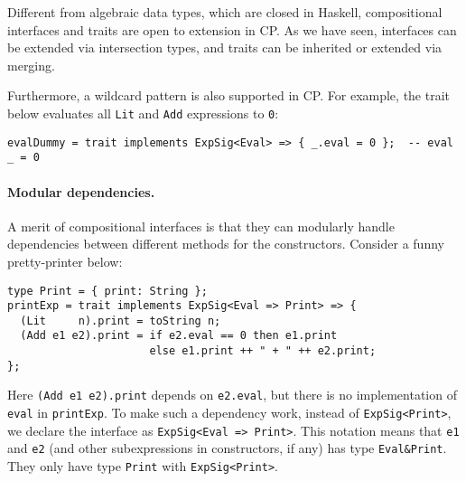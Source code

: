 \begin{tipblock}
Different from algebraic data types, which are closed in Haskell, compositional
interfaces and traits are open to extension in CP. As we have seen, interfaces
can be extended via intersection types, and traits can be inherited or extended
via merging.
\end{tipblock}

\noindent
Furthermore, a wildcard pattern is also supported in CP. For example, the trait
below evaluates all \lstinline{Lit} and \lstinline{Add} expressions to \lstinline{0}:
\begin{lstlisting}
evalDummy = trait implements ExpSig<Eval> => { _.eval = 0 };  -- eval _ = 0
\end{lstlisting}

\paragraph{Modular dependencies.}
A merit of compositional interfaces is that they can modularly handle
dependencies between different methods for the constructors. Consider a funny
pretty-printer below:
\begin{lstlisting}
type Print = { print: String };
printExp = trait implements ExpSig<Eval => Print> => {
  (Lit     n).print = toString n;
  (Add e1 e2).print = if e2.eval == 0 then e1.print
                      else e1.print ++ " + " ++ e2.print;
};
\end{lstlisting}
Here \lstinline{(Add e1 e2).print} depends on \lstinline{e2.eval}, but there is
no implementation of \lstinline{eval} in \lstinline{printExp}. To make such a
dependency work, instead of \lstinline{ExpSig<Print>}, we declare the interface
as \lstinline{ExpSig<Eval => Print>}. This notation means that \lstinline{e1}
and \lstinline{e2} (and other subexpressions in constructors, if any) has type
\lstinline{Eval&Print}. They only have type \lstinline{Print} with
\lstinline{ExpSig<Print>}.

